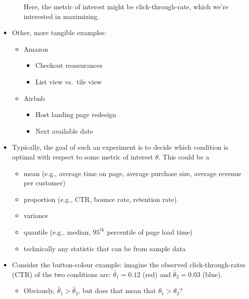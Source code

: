\begin{itemize}
\begin{itemize}
                    Here, the metric of interest might be click-through-rate, which
                    we're interested in maximizing.
          \end{itemize}
    \item Other, more tangible examples:
          \begin{itemize}
              \item Amazon
                    \begin{itemize}
                        \item Checkout reassurances
                        \item List view vs.\ tile view
                    \end{itemize}
              \item Airbnb
                    \begin{itemize}
                        \item Host landing page redesign
                        \item Next available date
                    \end{itemize}
          \end{itemize}
    \item Typically, the goal of such an experiment is to decide which condition is optimal
          with respect to some metric of interest $ \theta $. This could be a
          \begin{itemize}
              \item mean (e.g., average time on page, average purchase size, average revenue per customer)
              \item proportion (e.g., CTR, bounce rate, retention rate)
              \item variance
              \item quantile (e.g., median, $ 95^{\text{th}} $ percentile of page load time)
              \item technically any statistic that can be from sample data
          \end{itemize}
    \item Consider the button-colour example: imagine the observed click-through-rates (CTR) of the two
          conditions are: $ \hat{\theta}_1=0.12 $ (red) and $ \hat{\theta}_2=0.03 $ (blue).
          \begin{itemize}
              \item Obviously, $ \hat{\theta}_1>\hat{\theta}_2 $, but does that mean that
                    $ \theta_1>\theta_2 $?

\end{itemize}
\end{itemize}
